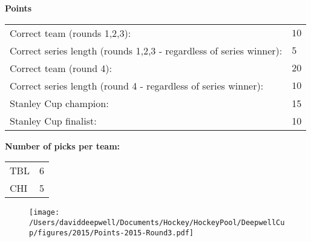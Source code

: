 \documentclass[10pt]{article}
\begin{document}
{\bf Points}\\
\begin{minipage}{12cm}
    \begin{tabular}{l l}
            Correct team (rounds 1,2,3):	& $10$\\
            Correct series length (rounds 1,2,3 - regardless of series winner):	& $5$\\
            Correct team (round 4):	& $20$\\
            Correct series length (round 4 - regardless of series winner):	& $10$\\
        Stanley Cup champion:	& 15\\
        Stanley Cup finalist:	& 10\\
    \end{tabular}

    \vspace{1cm}
    {\bf Number of picks per team:}\\
    \begin{tabular}{lc }
        TBL & 6 \\
        CHI & 5 \\
    \end{tabular}
\end{minipage}
\begin{minipage}[t]{13cm}
    \begin{figure}[H]
        \vspace{-2.5cm}
        \texttt{[image: /Users/daviddeepwell/Documents/Hockey/HockeyPool/DeepwellCup/figures/2015/Points-2015-Round3.pdf]}
    \end{figure}
\end{minipage}
\end{document}
